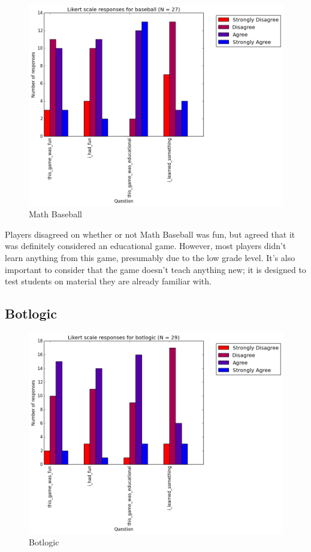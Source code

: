 				\begin{figure}[] 
				\centering 
				\includegraphics[width=\textwidth, height=.4\textheight, keepaspectratio=true]{baseball_likert.png} 
				\caption{Math Baseball}
				\end{figure}

				Players disagreed on whether or not Math Baseball was fun, but agreed that it was definitely considered an educational game. However, most players didn't learn anything from this game, presumably due to the low grade level. It's also important to consider that the game doesn't teach anything new; it is designed to test students on material they are already familiar with.

			\subsection{Botlogic}

				\begin{figure}[] 
				\centering 
				\includegraphics[width=\textwidth, height=.4\textheight, keepaspectratio=true]{botlogic_likert.png} 
				\caption{Botlogic}
				\end{figure}

